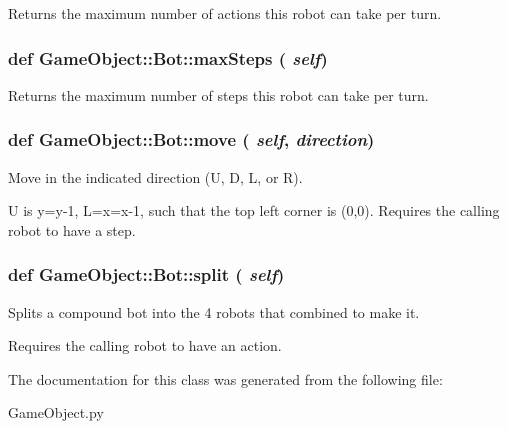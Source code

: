 Returns the maximum number of actions this robot can take per turn. 

\hypertarget{classGameObject_1_1Bot_ab2f7439ed0465837575635fadcd04e48}{
\subsubsection[{maxSteps}]{\setlength{\rightskip}{0pt plus 5cm}def GameObject::Bot::maxSteps ( {\em self})}}
\label{classGameObject_1_1Bot_ab2f7439ed0465837575635fadcd04e48}


Returns the maximum number of steps this robot can take per turn. 

\hypertarget{classGameObject_1_1Bot_a1a55ec801c2aff9eee777579972ad6ef}{
\subsubsection[{move}]{\setlength{\rightskip}{0pt plus 5cm}def GameObject::Bot::move ( {\em self}, \/   {\em direction})}}
\label{classGameObject_1_1Bot_a1a55ec801c2aff9eee777579972ad6ef}


Move in the indicated direction (U, D, L, or R). 

U is y=y-\/1, L=x=x-\/1, such that the top left corner is (0,0). Requires the calling robot to have a step. \hypertarget{classGameObject_1_1Bot_a580aa8beb8bf56bbd471db9474865b11}{
\subsubsection[{split}]{\setlength{\rightskip}{0pt plus 5cm}def GameObject::Bot::split ( {\em self})}}
\label{classGameObject_1_1Bot_a580aa8beb8bf56bbd471db9474865b11}


Splits a compound bot into the 4 robots that combined to make it. 

Requires the calling robot to have an action. 

The documentation for this class was generated from the following file:\begin{DoxyCompactItemize}
\item 
GameObject.py\end{DoxyCompactItemize}
